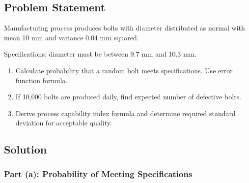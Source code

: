 \documentclass[12pt]{article}
\begin{document}
\subsection{Problem Statement}

Manufacturing process produces bolts with diameter distributed as normal with mean 10 mm and variance 0.04 mm squared.

Specifications: diameter must be between 9.7 mm and 10.3 mm.

\begin{enumerate}
\item[(a)] Calculate probability that a random bolt meets specifications. Use error function formula.
\item[(b)] If 10,000 bolts are produced daily, find expected number of defective bolts.
\item[(c)] Derive process capability index formula and determine required standard deviation for acceptable quality.
\end{enumerate}

\subsection{Solution}

\subsubsection{Part (a): Probability of Meeting Specifications}
\end{document}
